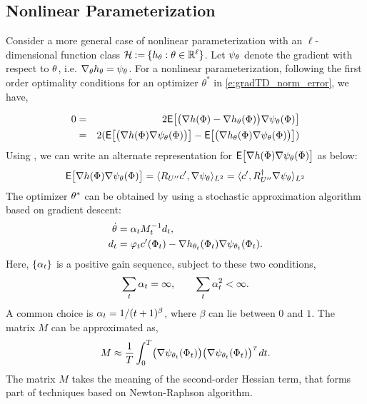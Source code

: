 \subsection{Nonlinear Parameterization}
Consider a more general case of nonlinear parameterization with an $\ell$- dimensional function class ${\cal H} \mathbin{:=} \{h_\theta : \theta \in \mathbb{R}^\ell\}$. Let $\psi_\theta$ denote the gradient with respect to $\theta$, i.e. $\nabla_\theta h_\theta = \psi_\theta$. For a nonlinear parameterization, following the first order optimality conditions for an optimizer $\theta^{*}$ in \eqref{e:gradTD_norm_error}, we have,

\begin{eqnarray*}
	0 & = &2 {\sf E} \bigl[\bigl(\nabla h(\Phi) - \nabla h_\theta (\Phi)\bigr) \nabla \psi_\theta (\Phi)\bigr]\\
	& = & 2 ({\sf E} \bigl[\bigl(\nabla h(\Phi)\nabla \psi_\theta (\Phi)\bigr)\bigr] - {\sf E} \bigl[\bigl(\nabla h_\theta (\Phi)\nabla \psi_\theta (\Phi)\bigr)\bigr])
\end{eqnarray*}
Using , we can write an alternate representation for ${\sf E} \bigl[ \nabla h(\Phi)\nabla \psi_\theta (\Phi)\bigr]$ as below:
\begin{eqnarray*}
	{\sf E}\bigl[\nabla h(\Phi)\nabla \psi_\theta (\Phi)\bigr]=\langle R_{U''}c',\nabla \psi_\theta\rangle_{L^2} =\langle c', R_{U''}^\dagger \nabla \psi_\theta\rangle_{L^2}
\end{eqnarray*}
The optimizer $\theta^*$ can be obtained by using a stochastic approximation algorithm based on gradient descent: %
\begin{equation*}
\begin{aligned}
\dot{\theta}&=\alpha_t M_{t}^{-1} d_t, \\ 
d_t & =\varphi_t  c'(\Phi_t)-\nabla h_{\theta_{t}}(\Phi_t)\nabla \psi_{\theta_{t}}(\Phi_t).
\end{aligned}
\end{equation*}
Here, $\{\alpha_t\}$ is a positive gain sequence, subject to these two conditions, 
\begin{equation}
\sum_t \alpha_t = \infty, \qquad \sum_t \alpha_t^2 < \infty.
\end{equation}
A common choice is $\alpha_t = 1/(t+1)^\beta$, where $\beta$ can lie between $0$ and $1$. The matrix $M$ can be approximated as,
\begin{equation}
M \approx \frac{1}{T}\int_0^T\bigl(\gradbasis_{\param_t}(\markovstate_t)\bigr)\bigl(\gradbasis_{\param_t}(\markovstate_t)\bigr)^{\transpose}\, dt.
\label{e:gradTD_M_int}
\end{equation}
The matrix $M$ takes the meaning of the second-order Hessian term, that forms part of techniques based on Newton-Raphson algorithm.
